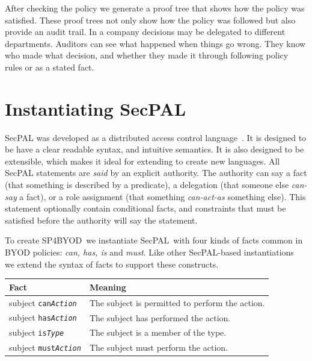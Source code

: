 \documentclass{llncs}
\newcommand{\AppPAL}[0]{SP4BYOD}
\begin{document}
After checking the policy we generate a proof tree that shows how the policy was satisfied.
These proof trees not only show how the policy was followed but also provide an audit trail.
In a company decisions may be delegated to different departments.
Auditors can see what happened when things go wrong.
They know who made what decision, and whether they made it through following policy rules or as a stated fact.


\section{Instantiating SecPAL}
\label{ssec:changes}

SecPAL was developed as a distributed access control language~\cite{becker_secpal:_2010}.
It is designed to be have a clear readable syntax, and intuitive semantics.
It is also designed to be extensible, which makes it ideal for extending to create new languages.
All SecPAL statements are \emph{said} by an explicit authority.
The authority can say a fact (that something is described by a predicate), a delegation (that someone else \emph{can-say} a fact), or a role assignment (that something \emph{can-act-as} something else).
This statement optionally contain conditional facts, and constraints that must be satisfied before the authority will say the statement.

To create \AppPAL~we instantiate SecPAL~with four kinds of facts common in BYOD policies: \emph{can, has, is} and \emph{must}.
Like other SecPAL-based instantiations~\cite{becker_framework_2009,aziz_secpal4dsa:_2011} we extend the syntax of facts to support these constructs.

\begin{center}
  \footnotesize\sffamily
  \newcommand{\predicate}[3]{#1 \texttt{#2\textit{#3}}}
  \begin{tabular}{l l}
    \toprule
    Fact                              & Meaning                                         \\
    \midrule
    \predicate{subject}{can}{Action}  & The subject is permitted to perform the action. \\
    \predicate{subject}{has}{Action}  & The subject has performed the action.           \\
    \predicate{subject}{is}{Type}     & The subject is a member of the type.            \\
    \predicate{subject}{must}{Action} & The subject must perform the action.            \\
    \bottomrule
  \end{tabular}
\end{center}
\end{document}
